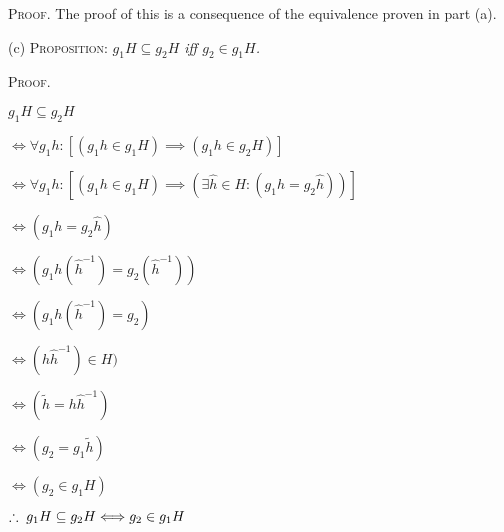 \documentclass[12pt, a4paper]{article}
\begin{document}
\newpage

\textsc{Proof. }The proof of this is a consequence of the equivalence proven in part (a).

\vspace{6mm}

\begin{list}
\item{(c) \textsc{Proposition:} \textit{$g_1H\subseteq g_2H$ iff $g_2\in g_1H$.}}
\end{list}

\vspace{2mm}

\textsc{Proof.}

\vspace{4mm}

$g_1H\subseteq g_2H$\par
\vspace{5mm}
\hspace{8.2mm}$\Leftrightarrow \forall g_1h\colon [(g_1h\in g_1H)\implies (g_1h\in g_2H)]$\par
\vspace{5mm}
\hspace{8.2mm}$\Leftrightarrow \forall g_1h\colon [(g_1h\in g_1H)\implies(\exists \hat{h}\in H\colon (g_1h=g_2\hat{h}))]$\par
\vspace{5mm}
\hspace{8.2mm}$\Leftrightarrow (g_1h=g_2\hat{h})$\par
\vspace{5mm}
\hspace{8.2mm}$\Leftrightarrow (g_1h(\hat{h}^{-1})=g_2(\hat{h}^{-1}))$\par
\vspace{5mm}
\hspace{8.2mm}$\Leftrightarrow (g_1h(\hat{h}^{-1})=g_2)$\par
\vspace{5mm}
\hspace{8.2mm}$\Leftrightarrow (h\hat{h}^{-1})\in H)$\par
\vspace{5mm}
\hspace{8.2mm}$\Leftrightarrow (\tilde{h}=h\hat{h}^{-1})$\par
\vspace{5mm}
\hspace{8.2mm}$\Leftrightarrow (g_2=g_1\tilde{h})$\par
\vspace{5mm}
\hspace{8.2mm}$\Leftrightarrow (g_2\in g_1H)$\par
\vspace{5mm}
\hspace{8.2mm}$\therefore\hspace{1mm} g_1H\subseteq g_2H\Longleftrightarrow g_2\in g_1H$\par
\end{document}
